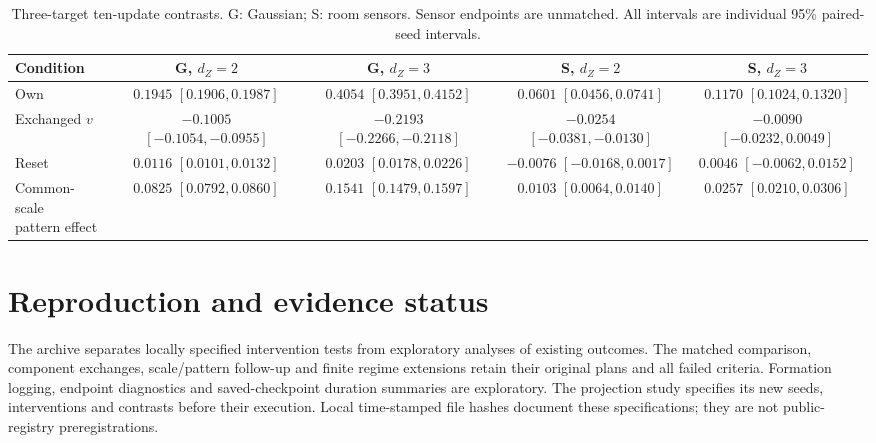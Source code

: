 \begin{table}[ht]\centering\small
\caption{Three-target ten-update contrasts. G: Gaussian; S: room sensors. Sensor endpoints are unmatched. All intervals are individual 95\% paired-seed intervals.}
\label{tab:targets}\label{tab:vb}\label{tab:vc}
\begin{tabular}{lcccc}\toprule
Condition & G, $d_Z=2$ & G, $d_Z=3$ & S, $d_Z=2$ & S, $d_Z=3$\\
\midrule
Own & \shortstack{$0.1945$\\$[0.1906,0.1987]$} & \shortstack{$0.4054$\\$[0.3951,0.4152]$} & \shortstack{$0.0601$\\$[0.0456,0.0741]$} & \shortstack{$0.1170$\\$[0.1024,0.1320]$}\\
Exchanged $v$ & \shortstack{$-0.1005$\\$[-0.1054,-0.0955]$} & \shortstack{$-0.2193$\\$[-0.2266,-0.2118]$} & \shortstack{$-0.0254$\\$[-0.0381,-0.0130]$} & \shortstack{$-0.0090$\\$[-0.0232,0.0049]$}\\
Reset & \shortstack{$0.0116$\\$[0.0101,0.0132]$} & \shortstack{$0.0203$\\$[0.0178,0.0226]$} & \shortstack{$-0.0076$\\$[-0.0168,0.0017]$} & \shortstack{$0.0046$\\$[-0.0062,0.0152]$}\\
\shortstack{Common-scale\\pattern effect} & \shortstack{$0.0825$\\$[0.0792,0.0860]$} & \shortstack{$0.1541$\\$[0.1479,0.1597]$} & \shortstack{$0.0103$\\$[0.0064,0.0140]$} & \shortstack{$0.0257$\\$[0.0210,0.0306]$}\\
\bottomrule\end{tabular}\end{table}

\section{Reproduction and evidence status}
\label{app:status}
The archive separates locally specified intervention tests from exploratory analyses of existing outcomes. The matched comparison, component exchanges, scale/pattern follow-up and finite regime extensions retain their original plans and all failed criteria. Formation logging, endpoint diagnostics and saved-checkpoint duration summaries are exploratory. The projection study specifies its new seeds, interventions and contrasts before their execution. Local time-stamped file hashes document these specifications; they are not public-registry preregistrations.

